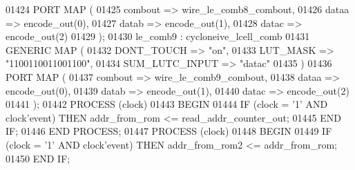 \begin{DoxyCode}
{01424       \textcolor{keywordflow}{PORT} \textcolor{keywordflow}{MAP} ( 
01425         combout => wire_le_comb8_combout,
01426         dataa => encode_out\textcolor{vhdlchar}{(}\textcolor{vhdllogic}{0}\textcolor{vhdlchar}{)},
01427         datab => encode_out\textcolor{vhdlchar}{(}\textcolor{vhdllogic}{1}\textcolor{vhdlchar}{)},
01428         datac => encode_out\textcolor{vhdlchar}{(}\textcolor{vhdllogic}{2}\textcolor{vhdlchar}{)}
01429       \textcolor{vhdlchar}{)};
01430     le_comb9 :  cycloneive\_lcell\_comb
01431       \textcolor{keywordflow}{GENERIC} \textcolor{keywordflow}{MAP} (
01432         DONT\_TOUCH => \textcolor{keyword}{"on"},
01433         LUT\_MASK => "\textcolor{vhdllogic}{1100110011001100}",
01434         SUM\_LUTC\_INPUT => \textcolor{keyword}{"datac"}
01435       \textcolor{vhdlchar}{)}
01436       \textcolor{keywordflow}{PORT} \textcolor{keywordflow}{MAP} ( 
01437         combout => wire_le_comb9_combout,
01438         dataa => encode_out\textcolor{vhdlchar}{(}\textcolor{vhdllogic}{0}\textcolor{vhdlchar}{)},
01439         datab => encode_out\textcolor{vhdlchar}{(}\textcolor{vhdllogic}{1}\textcolor{vhdlchar}{)},
01440         datac => encode_out\textcolor{vhdlchar}{(}\textcolor{vhdllogic}{2}\textcolor{vhdlchar}{)}
01441       \textcolor{vhdlchar}{)};
01442     \textcolor{keywordflow}{PROCESS} (clock)
01443 \textcolor{vhdlkeyword}{    BEGIN}
01444         \textcolor{keywordflow}{IF} \textcolor{vhdlchar}{(}\textcolor{vhdlchar}{clock} \textcolor{vhdlchar}{=} \textcolor{vhdlchar}{'}\textcolor{vhdllogic}{}\textcolor{vhdllogic}{1}\textcolor{vhdlchar}{'} \textcolor{keywordflow}{AND} \textcolor{vhdlchar}{clock}\textcolor{vhdlchar}{'}\textcolor{vhdlkeyword}{event}\textcolor{vhdlchar}{)} \textcolor{keywordflow}{THEN} \textcolor{vhdlchar}{addr_from_rom} \textcolor{vhdlchar}{<=} \textcolor{vhdlchar}{
      read_addr_counter_out};
01445         \textcolor{keywordflow}{END} \textcolor{keywordflow}{IF};
01446     \textcolor{keywordflow}{END} \textcolor{keywordflow}{PROCESS};
01447     \textcolor{keywordflow}{PROCESS} (clock)
01448 \textcolor{vhdlkeyword}{    BEGIN}
01449         \textcolor{keywordflow}{IF} \textcolor{vhdlchar}{(}\textcolor{vhdlchar}{clock} \textcolor{vhdlchar}{=} \textcolor{vhdlchar}{'}\textcolor{vhdllogic}{}\textcolor{vhdllogic}{1}\textcolor{vhdlchar}{'} \textcolor{keywordflow}{AND} \textcolor{vhdlchar}{clock}\textcolor{vhdlchar}{'}\textcolor{vhdlkeyword}{event}\textcolor{vhdlchar}{)} \textcolor{keywordflow}{THEN} \textcolor{vhdlchar}{addr_from_rom2} \textcolor{vhdlchar}{<=} \textcolor{vhdlchar}{addr_from_rom};
01450         \textcolor{keywordflow}{END} \textcolor{keywordflow}{IF};
}
\end{DoxyCode}
